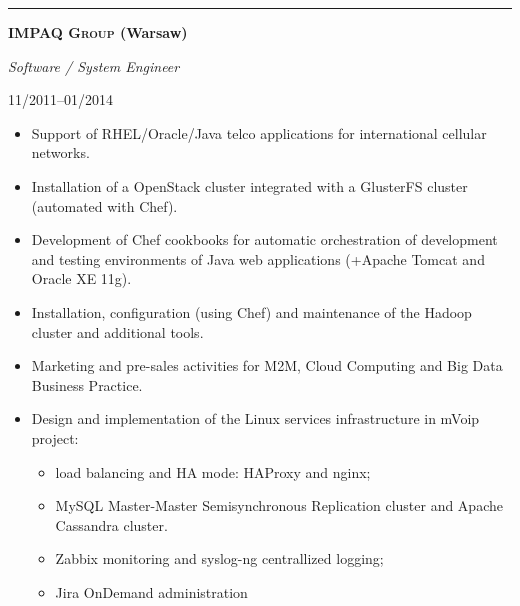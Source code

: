 \documentclass[$fontsize$, a4paper]{article}
\newcommand\textbox[1]{%
  \parbox{.333\textwidth}{#1}%
}
\newcommand{\note}[1]{\marginnote{\scriptsize #1}}
\begin{document}
\noindent\rule[0.5ex]{\linewidth}{1pt}

\noindent\textbox{\textbf{\textsc{IMPAQ Group} (Warsaw)}\hfill}\textbox{\hfil \emph{Software / System Engineer}\hfil}\textbox{\hfill 11/2011--01/2014}
\begin{itemize}
  \item Support of RHEL/Oracle/Java telco applications for international cellular networks.
  \item Installation of a OpenStack cluster integrated with a GlusterFS cluster (automated with Chef).
  \item Development of Chef cookbooks for automatic orchestration of development and testing environments of Java web applications (+Apache Tomcat and Oracle XE 11g).
  \item Installation, configuration (using Chef) and maintenance of the Hadoop cluster and additional tools.
  \item Marketing and pre-sales activities for M2M, Cloud Computing and Big Data Business Practice.

  \item Design and implementation of the Linux services infrastructure in mVoip project:
  \begin{itemize}
    \item load balancing and HA mode: HAProxy and nginx;
    \item MySQL Master-Master Semisynchronous Replication cluster and Apache Cassandra cluster.
    \item Zabbix monitoring and syslog-ng centrallized logging;
    \item Jira OnDemand administration
  \end{itemize}

\end{itemize}






\end{document}
